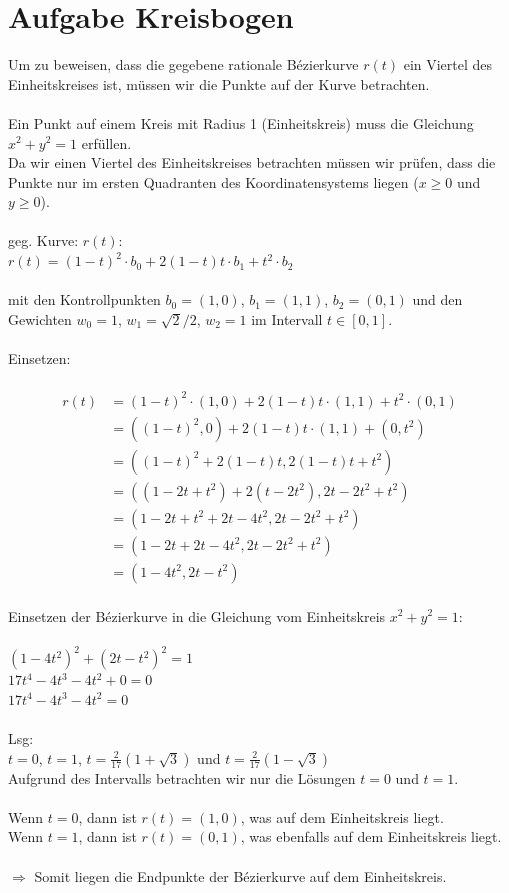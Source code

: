 \documentclass{article}
\begin{document}
\section{Aufgabe Kreisbogen}
Um zu beweisen, dass die gegebene rationale Bézierkurve $ r(t) $ ein Viertel des Einheitskreises ist, müssen wir die Punkte auf der Kurve betrachten.\\
\\
Ein Punkt auf einem Kreis mit Radius 1 (Einheitskreis) muss die Gleichung $ x^2 + y^2 = 1 $ erfüllen.\\
Da wir einen Viertel des Einheitskreises betrachten müssen wir prüfen, dass die Punkte nur im ersten Quadranten des Koordinatensystems liegen (\( x \geq 0 \) und \( y \geq 0 \)).\\
\\
geg. Kurve: $ r(t) $:\\
$ r(t) = (1-t)^2 \cdot b_0 + 2(1-t)t \cdot b_1 + t^2 \cdot b_2 $\\
\\
mit den Kontrollpunkten $ b_0 = (1, 0) $, $ b_1 = (1, 1) $, $ b_2 = (0, 1) $ und den Gewichten $ w_0 = 1 $, $ w_1 = \sqrt{2}/2 $, $ w_2 = 1 $ im Intervall $ t \in [0, 1] $.
\\
\\
Einsetzen:\\
\\
\begin{align*}
r(t) &= (1-t)^2 \cdot (1, 0) + 2(1-t)t \cdot (1, 1) + t^2 \cdot (0, 1) \\
&= ((1-t)^2, 0) + 2(1-t)t \cdot (1, 1) + (0, t^2) \\
&= ((1-t)^2 + 2(1-t)t, 2(1-t)t + t^2) \\
&= ((1 - 2t + t^2) + 2(t - 2t^2), 2t - 2t^2 + t^2) \\
&= (1 - 2t + t^2 + 2t - 4t^2, 2t - 2t^2 + t^2) \\
&= (1 - 2t + 2t - 4t^2, 2t - 2t^2 + t^2) \\
&= (1 - 4t^2, 2t - t^2)
\end{align*}
\\
Einsetzen der Bézierkurve in die Gleichung vom Einheitskreis $ x^2 + y^2 = 1 $:\\
\\
$ (1 - 4t^2)^2 + (2t - t^2)^2 = 1 $\\
$ 17t^4 - 4t^3 - 4t^2 + 0 = 0 $\\
$ 17t^4 - 4t^3 - 4t^2 = 0$\\
\\
Lsg:\\ $ t = 0 $, $ t = 1 $, $ t = \frac{2}{17}(1 + \sqrt{3}) $ und $ t = \frac{2}{17}(1 - \sqrt{3}) $\\
Aufgrund des Intervalls betrachten wir nur die Lösungen \( t = 0 \) und \( t = 1 \).\\
\\
Wenn \( t = 0 \), dann ist \( r(t) = (1, 0) \), was auf dem Einheitskreis liegt.\\
Wenn \( t = 1 \), dann ist \( r(t) = (0, 1) \), was ebenfalls auf dem Einheitskreis liegt.\\
\\
$\Rightarrow$ Somit liegen die Endpunkte der Bézierkurve auf dem Einheitskreis.
\end{document}
